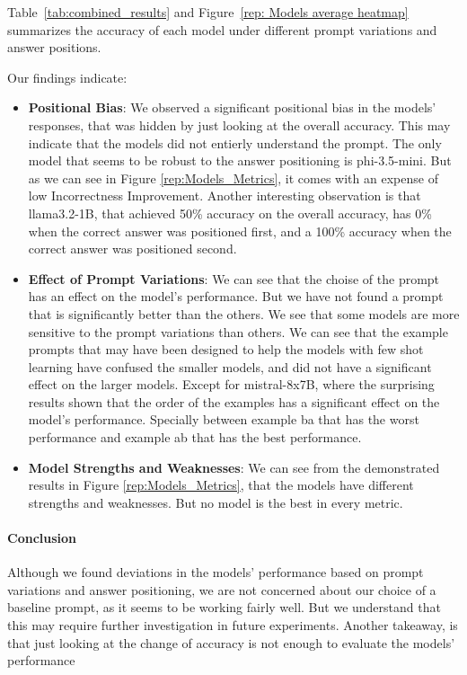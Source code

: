 Table~\ref{tab:combined_results} and Figure~\ref{rep: Models average heatmap} summarizes the accuracy of each model under different prompt variations and answer positions.

Our findings indicate:

\begin{itemize}
  \item \textbf{Positional Bias}: We observed a significant positional bias in the models' responses, that was hidden by just looking at the overall accuracy. This may indicate that the models did not entierly understand the prompt. The only model that seems to be robust to the answer positioning is phi-3.5-mini. But as we can see in Figure \ref{rep:Models_Metrics}, it comes with an expense of low Incorrectness Improvement. Another interesting observation is that llama3.2-1B, that achieved 50\% accuracy on the overall accuracy, has 0\% when the correct answer was positioned first, and a 100\% accuracy when the correct answer was positioned second.
  \item \textbf{Effect of Prompt Variations}: We can see that the choise of the prompt has an effect on the model's performance. But we have not found a prompt that is significantly better than the others. We see that some models are more sensitive to the prompt variations than others. We can see that the example prompts that may have been designed to help the models with few shot learning have confused the smaller models, and did not have a significant effect on the larger models. Except for mistral-8x7B, where the surprising results shown that the order of the examples has a significant effect on the model's performance. Specially between example ba that has the worst performance and example ab that has the best performance.
  \item \textbf{Model Strengths and Weaknesses}: We can see from the demonstrated results in Figure \ref{rep:Models_Metrics}, that the models have different strengths and weaknesses. But no model is the best in every metric.
\end{itemize}

\paragraph{Conclusion}

Although we found deviations in the models' performance based on prompt variations and answer positioning, we are not concerned about our choice of a baseline prompt, as it seems to be working fairly well. But we understand that this may require further investigation in future experiments.
Another takeaway, is that just looking at the change of accuracy is not enough to evaluate the models' performance

